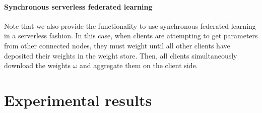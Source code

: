\documentclass[twocolumn, switch]{article} %
\begin{document}
\paragraph{Synchronous serverless federated learning}

Note that we also provide the functionality to use synchronous federated learning in a serverless fashion. In this case, when clients are attempting to get parameters from other connected nodes, they must weight until all other clients have deposited their weights in the weight store. Then, all clients simultaneously download the weights $\omega$ and aggregate them on the client side. 

\section{Experimental results}






\end{document}

